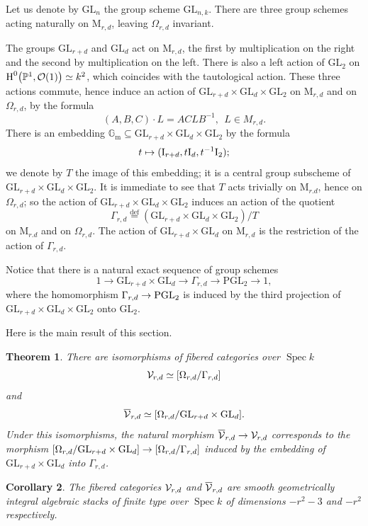 \documentclass{amsart}
\numberwithin{equation}{section}
\numberwithin{subsection}{section}
\newtheorem{theorem}{Theorem}[section]
\newtheorem{corollary}[theorem]{Corollary}
\theoremstyle{definition}
\theoremstyle{remark}
\newcommand\cO{\mathcal{O}} \newcommand\cP{\mathcal{P}}
\newcommand\rI{\mathrm{I}} \newcommand\rJ{\mathrm{J}}
\newcommand\rM{\mathrm{M}} \newcommand\rN{\mathrm{N}}
\newcommand\arr{\ifinner\to\else\longrightarrow\fi}
\newcommand\arrto{\ifinner\mapsto\else\longmapsto\fi}
\newcommand\larr{\longrightarrow}
\renewcommand\H{\operatorname{H}}
\newcommand\eqdef{\overset{\mathrm{\scriptscriptstyle def}} =}
\newcommand\spec{\operatorname{Spec}}
\newcommand{\vectp}[1][r,d]{\overline{\cV}_{#1}}
\newcommand{\vect}[1][r,d]{\cV_{#1}}
\newcommand{\om}[1][r,d]{\Omega_{#1}}
\newcommand{\mm}[1][r,d]{\rM_{#1}}
\newcommand{\grp}[1][r,d]{\Gamma_{#1}}
\newcommand{\GL}{\mathrm{GL}}
\newcommand{\PGL}{\mathrm{PGL}}
\newcommand{\gm}{\mathbb{G}_{\mathrm{m}}}
\begin{document}
Let us denote by $\GL_{n}$ the group scheme $\GL_{n, k}$. There are three group schemes acting naturally on $\rM_{r,d}$, leaving $\om$ invariant.

The groups $\GL_{r+d}$ and $\GL_{d}$ act on $\mm$, the first by multiplication on the right and the second by multiplication on the left. There is also a left action of $\GL_{2}$ on $\H^{0}\bigl(\PP^{1}, \cO(1)\bigr) \simeq k^{2}$, which coincides with the tautological action. These three actions commute, hence induce an action of $\GL_{r+d} \times \GL_{d} \times \GL_{2}$ on $\mm$ and on $\om$, by the formula
   \begin{equation}\label{eq:action}
   (A,B,C)\cdot L = ACLB^{-1},\ \ L\in M_{r,d}.
   \end{equation}
There is an embedding $\gm \subseteq \GL_{r+d} \times \GL_{d} \times \GL_{2}$ by the formula
   \[
   t \arrto (\rI_{r+d},t\rI_{d},t^{-1}\rI_{2});
   \]
we denote by $T$ the image of this embedding; it is a central group subscheme of $\GL_{r+d} \times \GL_{d} \times \GL_{2}$. It is immediate to see that $T$ acts trivially on $\rM_{r.d}$, hence on $\om$; so the action of $\GL_{r+d} \times \GL_{d} \times \GL_{2}$ induces an action of the quotient
   \[
   \grp \eqdef (\GL_{r+d} \times \GL_{d} \times \GL_{2})/T
   \]
on $\rM_{r.d}$ and on $\om$. The action of $\GL_{r+d} \times \GL_{d}$ on $\mm$ is the restriction of the action of $\grp$.

Notice that there is a natural exact sequence of group schemes
   \[
   1 \larr \GL_{r+d} \times \GL_{d} \larr \grp \larr \PGL_{2} \larr 1,
   \]
where the homomorphism $\grp \arr \PGL_{2}$ is induced by the third projection of $\GL_{r+d} \times \GL_{d} \times \GL_{2}$ onto $\GL_{2}$.

Here is the main result of this section.

\begin{theorem}\label{thm:main-vector-bundles}
There are isomorphisms of fibered categories over $\spec k$
   \[
   \vect \simeq [\om/\grp]
   \]
and
   \[
   \vectp \simeq [\om/\GL_{r+d} \times \GL_{d}].
   \]
Under this isomorphisms, the natural morphism $\vectp \arr \vect$ corresponds to the morphism $[\om/\GL_{r+d} \times \GL_{d}] \arr [\om/\grp]$ induced by the embedding of $\GL_{r+d} \times \GL_{d}$ into $\grp$.
\end{theorem}

\begin{corollary}
The fibered categories $\vect$ and $\vectp$ are smooth geometrically integral algebraic stacks of finite type over $\spec k$ of dimensions $-r^{2}-3$ and $-r^{2}$ respectively.
\end{corollary}
\end{document}
